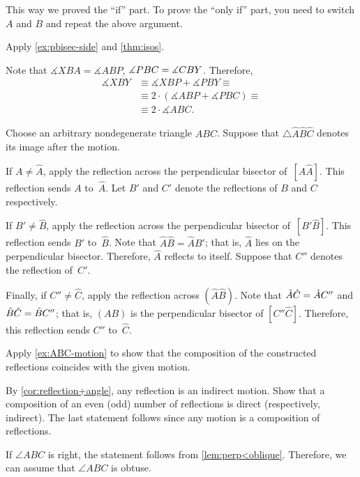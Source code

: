 \begin{multicols}{2}
This way we proved the ``if'' part.
To prove the ``only if'' part, you need to switch $A$ and $B$ and
repeat the above argument.

Apply \ref{ex:pbisec-side} and \ref{thm:isos}.

Note that $\measuredangle XBA=\measuredangle ABP$, $\measuredangle PBC\z=\measuredangle CBY$.
Therefore,
\begin{align*}
\measuredangle XBY
&\equiv
\measuredangle XBP+\measuredangle PBY\equiv
\\
&\equiv
 2\cdot(\measuredangle ABP+\measuredangle PBC)\equiv
\\
&
\equiv
 2\cdot \measuredangle ABC.
\end{align*}

\vskip-4mm

Choose an arbitrary nondegenerate triangle $ABC$.
Suppose that $\triangle \hat A \hat B\hat C$ denotes its image after the motion.

If $A\ne \hat A$, apply the reflection across the perpendicular bisector of~$[A\hat A]$.
This reflection sends $A$ to~$\hat A$.
Let $B'$ and $C'$ denote the reflections of $B$ and $C$ respectively.

If $B'\ne \hat B$, apply the reflection across the perpendicular bisector of~$[B'\hat B]$.
This reflection sends $B'$ to~$\hat B$.
Note that $\hat A\hat B=\hat AB'$;
that is, $\hat A$ lies on the perpendicular bisector. 
Therefore, $\hat A$ reflects to itself.
Suppose that $C''$ denotes the reflection of~$C'$.

Finally, if $C''\ne \hat C$, apply the reflection across $(\hat A\hat B)$.
Note that $\hat A\hat C\z=\hat AC''$ and $\hat B\hat C\z=\hat BC''$;
that is, $(AB)$ is the perpendicular bisector of $[C''\hat C]$.
Therefore, this reflection sends $C''$ to~$\hat C$.

Apply \ref{ex:ABC-motion} to show that the composition of the constructed reflections coincides with the given motion.

By \ref{cor:reflection+angle}, any reflection is an indirect motion.
Show that a composition of an even (odd) number of reflections is direct (respectively, indirect).
The last statement follows since any motion is a composition of reflections.

If $\angle ABC$ is right, the statement follows from \ref{lem:perp<oblique}.
Therefore, we can assume that $\angle ABC$ is obtuse.


\end{multicols}
